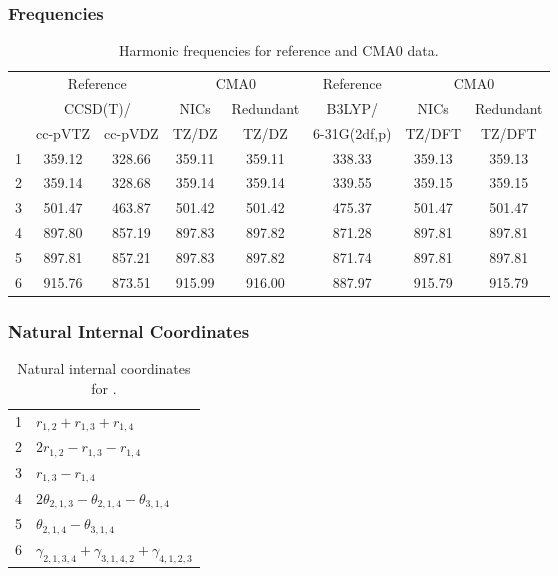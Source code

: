 \documentclass[10pt,oneside]{article}
\begin{document}
\begin{table}[h!]
\subsubsection*{Frequencies}
\centering
\caption{Harmonic frequencies for reference and CMA0 data.}
\begin{tabular}{cccccccc}
\toprule
{} & \multicolumn{2}{c}{Reference} & \multicolumn{2}{c}{CMA0} &    Reference & \multicolumn{2}{c}{CMA0} \\
{} & \multicolumn{2}{c}{CCSD(T)/} &   NICs &  Redundant &       B3LYP/ &   NICs & Redundant \\
{} &   cc-pVTZ & cc-pVDZ &  TZ/DZ &      TZ/DZ & 6-31G(2df,p) & TZ/DFT &    TZ/DFT \\
\midrule
1 &    359.12 &  328.66 & 359.11 &     359.11 &       338.33 & 359.13 &    359.13 \\
2 &    359.14 &  328.68 & 359.14 &     359.14 &       339.55 & 359.15 &    359.15 \\
3 &    501.47 &  463.87 & 501.42 &     501.42 &       475.37 & 501.47 &    501.47 \\
4 &    897.80 &  857.19 & 897.83 &     897.82 &       871.28 & 897.81 &    897.81 \\
5 &    897.81 &  857.21 & 897.83 &     897.82 &       871.74 & 897.81 &    897.81 \\
6 &    915.76 &  873.51 & 915.99 &     916.00 &       887.97 & 915.79 &    915.79 \\
\bottomrule
\end{tabular}
\end{table}

\begin{table}[h!]
\subsubsection*{Natural Internal Coordinates}
\centering
\caption{Natural internal coordinates for .}
\small
\begin{tabular}{ll}
\toprule
  1   & $r_{1,2} + r_{1,3} + r_{1,4}$ \\
  2   & $2r_{1,2} - r_{1,3} - r_{1,4}$ \\
  3   & $r_{1,3} - r_{1,4}$ \\
  4   & $2\theta_{2,1,3} - \theta_{2,1,4} - \theta_{3,1,4}$ \\
  5   & $\theta_{2,1,4} - \theta_{3,1,4}$ \\
  6   & $\gamma_{2,1,3,4} + \gamma_{3,1,4,2} + \gamma_{4,1,2,3}$ \\
\bottomrule
\end{tabular}
\end{table}
\end{document}
